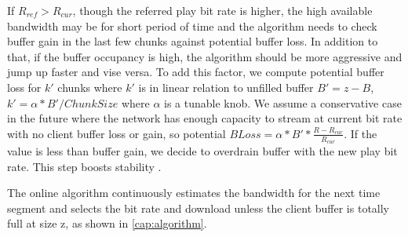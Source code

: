 If $R_{ref} >R_{cur} $, though the referred play bit rate is higher,
the high available bandwidth may be for short period of time and the
algorithm needs to check buffer gain in the last few chunks against
potential buffer loss. In addition to that, if the buffer occupancy is
high, the algorithm should be more aggressive and jump up faster and
vise versa. To add this factor, we compute potential buffer loss for
$k'$ chunks where $k'$ is in linear relation to unfilled buffer
$B'=z-B$, $k'=\alpha * B'/ChunkSize$ 
where $\alpha$ is a tunable knob. We assume a conservative case in the
future where the network has enough capacity to stream at current bit
rate with no client buffer loss or gain, so potential $BLoss=\alpha *
B' *\frac{R-R_{cur}}{R_{cur}} $. If the value is less than buffer
gain, we decide to overdrain buffer with the new play bit rate. This
step boosts stability .

The online algorithm continuously estimates the bandwidth for the next
time segment and selects the bit rate and download unless the client
buffer is totally full at size z, as shown in
\autoref{cap:algorithm}. 






